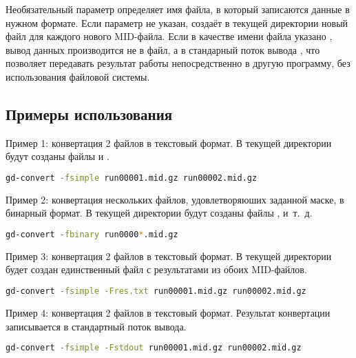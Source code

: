 Необязательный параметр  определяет имя файла, в который записаются данные в нужном формате. Если параметр не указан, \GDCONVERT{} создаёт в текущей директории новый файл для каждого нового MID-файла. Если в качестве имени файла указано , вывод данных производится не в файл, а в стандарный поток вывода \cite{LinuxInOutStream}, что позволяет передавать результат работы \GDCONVERT{} непосредственно в другую программу, без использования файловой системы.

\subsection{Примеры использования}

Пример 1: конвертация 2 файлов в текстовый формат. В текущей директории будут созданы файлы  и .

\begin{lstlisting}[language=bash]
gd-convert -fsimple run00001.mid.gz run00002.mid.gz
\end{lstlisting}

\bigskip

Пример 2: конвертация нескольких файлов, удовлетворяюших заданной маске, в бинарный формат. В текущей директории будут созданы файлы ,  и~т.~д.

\begin{lstlisting}[language=bash]
gd-convert -fbinary run0000*.mid.gz
\end{lstlisting}

\bigskip

Пример 3: конвертация 2 файлов в текстовый формат. В текущей директории будет создан единственный файл  с результатами из обоих MID-файлов.

\begin{lstlisting}[language=bash]
gd-convert -fsimple -Fres.txt run00001.mid.gz run00002.mid.gz
\end{lstlisting}

\bigskip

Пример 4: конвертация 2 файлов в текстовый формат. Результат конвертации записывается в стандартный поток вывода.

\begin{lstlisting}[language=bash]
gd-convert -fsimple -Fstdout run00001.mid.gz run00002.mid.gz
\end{lstlisting}
